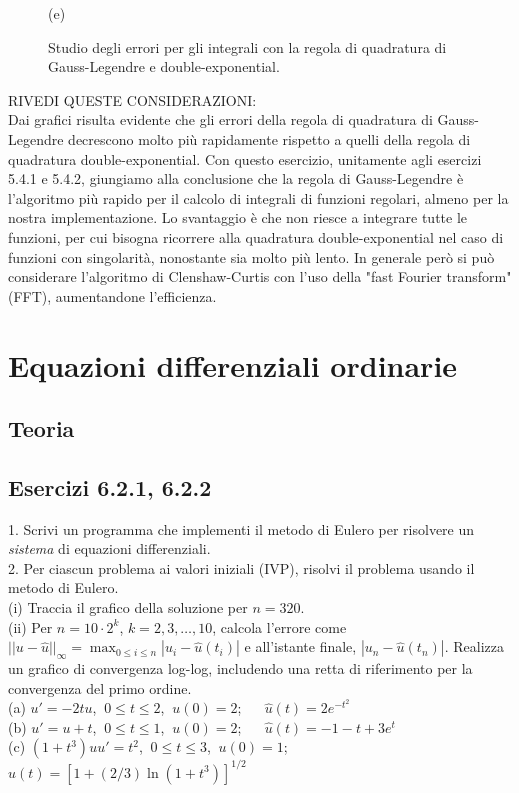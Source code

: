 \documentclass[letterpaper, 12pt]{article}
\begin{document}
\begin{figure}[!ht]
\begin{minipage}[b]{0.47\textwidth}
        \caption*{(e)}
    \end{minipage}
    \caption{Studio degli errori per gli integrali con la regola di quadratura di Gauss-Legendre e double-exponential.}
    \label{fig:es5_4_3_1}
\end{figure}

RIVEDI QUESTE CONSIDERAZIONI: \\
Dai grafici risulta evidente che gli errori della regola di quadratura di Gauss-Legendre decrescono molto
più rapidamente rispetto a quelli della regola di quadratura double-exponential. Con questo esercizio, unitamente
agli esercizi 5.4.1 e 5.4.2, giungiamo alla conclusione che la regola di Gauss-Legendre è l'algoritmo più
rapido per il calcolo di integrali di funzioni regolari, almeno per la nostra implementazione. 
Lo svantaggio è che non riesce a integrare tutte le funzioni, per cui bisogna ricorrere alla quadratura 
double-exponential nel caso di funzioni con singolarità, nonostante sia molto più lento. In generale però
si può considerare l'algoritmo di Clenshaw-Curtis con l'uso della "fast Fourier transform" (FFT), aumentandone
l'efficienza.

\section{Equazioni differenziali ordinarie}
\subsection{Teoria}

\subsection{Esercizi 6.2.1, 6.2.2}
1. Scrivi un programma che implementi il metodo di Eulero per risolvere un \textit{sistema} 
di equazioni differenziali.\\
2. Per ciascun problema ai valori iniziali (IVP), risolvi il problema usando il metodo di Eulero. \\
(i) Traccia il grafico della soluzione per $n=320$. \\
(ii) Per $n=10\cdot2^k$, $k=2,3,\ldots,10$, calcola l'errore come 
$||u-\hat{u}||_\infty=\max_{0\leq i\leq n} |u_i-\hat{u}(t_i)|$ e all'istante finale, $|u_n-\hat{u}(t_n)|$. 
Realizza un grafico di convergenza log-log, includendo una retta di riferimento per la convergenza del 
primo ordine.\\
(a) $u' = -2t u$, $\ 0 \le t \le 2$, $\ u(0) = 2$;  
$\quad$ $\hat{u}(t) = 2e^{-t^2}$ \\
(b) $u' = u + t$, $\ 0 \le t \le 1$, $\ u(0) = 2$;  
$\quad$ $\hat{u}(t) = -1-t+3e^t$ \\
(c) $(1+t^3)uu' = t^2$, $\ 0 \le t \le 3$, $\ u(0) =1$; 
$\quad$ $\hat{u}(t) = [1+(2/3)\ln (1+t^3)]^{1/2}$
\end{document}

